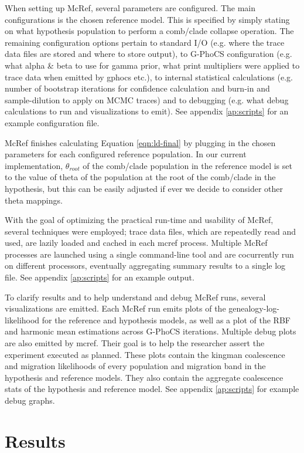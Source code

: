 \documentclass[11pt]{article}
\newcommand{\1}{\mathbbm{1}}
\newcommand{\gp}{G-PhoCS }
\begin{document}
When setting up McRef, several parameters are configured.
%
The main configurations is the chosen reference model. This is specified by simply stating on what hypothesis population to perform a comb/clade collapse operation.
%
The remaining configuration options pertain to standard I/O (e.g. where the trace data files are stored and where to store output), to \gp configuration (e.g. what alpha \& beta to use for gamma prior, what print multipliers were applied to trace data when emitted by gphocs etc.), to internal statistical calculations (e.g. number of bootstrap iterations for confidence calculation and burn-in and sample-dilution to apply on MCMC traces) and to debugging (e.g. what debug calculations to run and visualizations to emit). 
%
See appendix \ref{ap:scripts} for an example configuration file.

McRef finishes calculating Equation \ref{eqn:ld-final} by plugging in the chosen parameters for each configured reference population. In our current implementation, $\theta_{root}$ of the comb/clade population in the reference model is set to the value of theta of the population at the root of the comb/clade in the hypothesis, but this can be easily adjusted if ever we decide to consider other theta mappings. 

With the goal of optimizing the practical run-time and usability of McRef, several techniques were employed; trace data files, which are repeatedly read and used, are lazily loaded and cached in each mcref process. Multiple McRef processes are launched using a single command-line tool and are cocurrently run on different processors, eventually aggregating summary results to a single log file. See appendix \ref{ap:scripts} for an example output.

To clarify results and to help understand and debug McRef runs, several visualizations are emitted. Each McRef run emits plots of the genealogy-log-likelihood for the reference and hypothesis models, as well as a plot of the RBF and harmonic mean estimations across \gp iterations. 
%
Multiple debug plots are also emitted by mcref. Their goal is to help the researcher assert the experiment executed as planned. These plots contain the kingman coalescence and migration likelihoods of every population and migration band in the hypothesis and reference models. They also contain the aggregate coalescence stats of the hypothesis and reference model. See appendix \ref{ap:scripts} for example debug graphs.



\section{Results} \label{Results}
\end{document}
